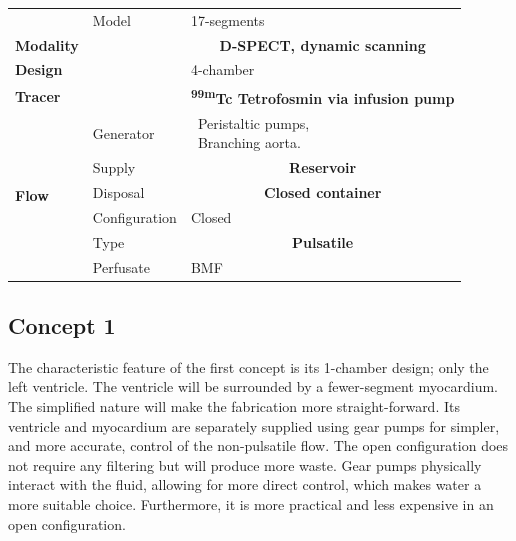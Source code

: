 \begin{table}[H]
\begin{tabular}{ll|l|}
										& Model 			&  17-segments\\
	\textbf{Modality}					&					& \multicolumn{1}{c|}{\textbf{D-SPECT, dynamic scanning}} \\
	\textbf{Design}						& 					& 4-chamber \\
	\textbf{Tracer}						&					& \multicolumn{1}{c|}{\textbf{\textsuperscript{99m}Tc Tetrofosmin via infusion pump}} \\
	\multirow{6}{*}{\textbf{Flow}}		& Generator 		& \makecell[l]{\textbullet\ Peristaltic pumps, \\ \textbullet\ Branching aorta.}\\
										& Supply			&  \multicolumn{1}{c|}{\textbf{Reservoir}} \\
										& Disposal			&  \multicolumn{1}{c|}{\textbf{Closed container}} \\
										& Configuration 	&  Closed\\
										& Type				& \multicolumn{1}{c|}{\cellcolor{red} \textbf{Pulsatile}} \\
										& Perfusate			&  BMF\\ \cline{3-3}
\end{tabular}
\end{table}
\subsection{Concept 1}
The characteristic feature of the first concept is its 1-chamber design; only the left ventricle. The ventricle will be surrounded by a fewer-segment myocardium. The simplified nature will make the fabrication more straight-forward. Its ventricle and myocardium are separately supplied using gear pumps for simpler, and more accurate, control of the non-pulsatile flow. The open configuration does not require any filtering but will produce more waste. Gear pumps physically interact with the fluid, allowing for more direct control, which makes water a more suitable choice. Furthermore, it is more practical and less expensive in an open configuration.

